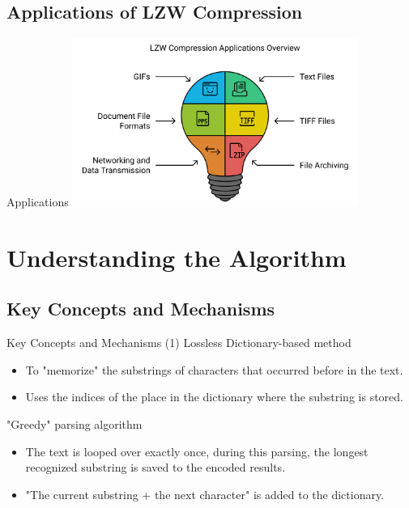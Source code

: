 \documentclass[10pt,handout,english]{beamer}
\begin{document}
\subsection{Applications of LZW Compression}

\begin{frame}{Applications}
    \centering
    \includegraphics[width=0.7\textwidth]{pic/application.png}
    \vspace{0.2cm}
\end{frame}

\section{Understanding the Algorithm}
\subsection{Key Concepts and Mechanisms}

\begin{frame}{Key Concepts and Mechanisms (1)}
    Lossless Dictionary-based method
    \begin{itemize}[label=\textcolor{purple}{$\bullet$}]
        \item To "memorize" the substrings of characters that occurred before in the text.
        \vspace{0.2pt}
        \item  Uses the indices of the place in the dictionary where the substring is stored.
    \end{itemize}

    "Greedy" parsing algorithm 
    \begin{itemize}[label=\textcolor{purple}{$\bullet$}]
        \item The text is looped over exactly once, during this parsing, the longest recognized substring is saved to the encoded results.
        \vspace{0.2pt}
        \item  "The current substring + the next character" is added to the dictionary.
    \end{itemize}
    
\end{frame}
\end{document}
